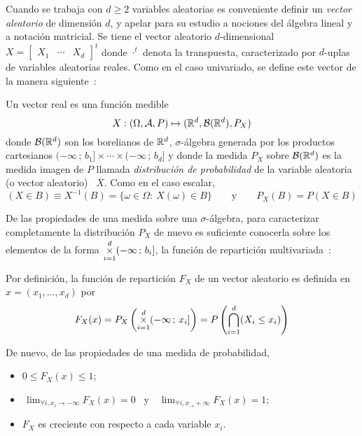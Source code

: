 Cuando se trabaja  con $d\geq 2$ variables aleatorias  es conveniente definir un
{\it vector aleatorio}  de dimensi\'on $d$, y apelar para  su estudio a nociones
del \'algebra  lineal y  a notaci\'on matricial.   Se tiene el  vector aleatorio
$d$-dimensional \ $X = \begin{bmatrix} X_1 & \cdots & X_d \end{bmatrix}^t$ donde
$\cdot^t$  denota  la  transpuesta,  caracterizado por  $d$-uplas  de  variables
aleatorias reales.   Como en  el caso  univariado, se define  este vector  de la
manera siguiente~\cite{AthLah06, Coh13, Bre88}:
%
\begin{definicion}
  Un vector real es una funci\'on medible
  \[
  X: (\Omega,\mathcal{A},P) \mapsto (\mathbb{R}^d,\mathcal{B}(\mathbb{R}^d),P_X)
  \]
  donde  $\mathcal{B}(\mathbb{R}^d)$  son  los  borelianos  de  $\mathbb{R}^d$,  $\sigma$-\'algebra
  generada por  los productos cartesianos $(-\infty  \, ; \,  b_1] \times \cdots
  \times (-\infty \,  ; \, b_d]$ y donde la medida  $P_X$ sobre $\mathcal{B}(\mathbb{R}^d)$ es
  la medida  imagen de  $P$ llamada {\it  distribuci\'on de probabilidad}  de la
  variable aleatoria (o vector aleatorio) \ $X$. Como en el caso escalar,
 \[
 (X \in B) \equiv X^{-1}(B) = \{ \omega \in \Omega: \: X(\omega) \in B \} \qquad
 \mbox{y} \qquad P_X(B) = P(X \in B)
 \]
\end{definicion}
%
De las propiedades de una medida sobre una $\sigma$-\'algebra, para caracterizar
completamente la distribuci\'on $P_X$ de nuevo es suficiente conocerla sobre los
elementos de  la forma $\displaystyle  \operatorname*{\times}_{i=1}^d (-\infty \, ;  \, b_i]$,
\ie  la funci\'on  de repartici\'on  multivariada~\cite{AthLah06,  Coh13, Bre88,
  HogMck13}:
%
\begin{definicion}
  Por  definici\'on,  la  funci\'on  de  repartici\'on  $F_X$  de  un vector
  aleatorio es definida en $x = (x_1 , \ldots , x_d)$ por
  \[
  F_X(x) =  P_X\left( \operatorname*{\times}_{i=1}^d (-\infty \,  ; \, x_i]  \right) = P\left(
    \bigcap_{i=1}^d (X_i \le x_i) \right)
  \]
\end{definicion}
%
De nuevo, de las propiedades de una medida de probabilidad,
%
\begin{itemize}
\item $0 \le F_X(x) \le 1$;
%
\item $\displaystyle  \, \lim_{\forall  i, x_i \to  -\infty} F_X(x)  = 0$ \  y \
  $\displaystyle \, \lim_{\forall i, x_ \to +\infty} F_X(x) = 1$;
%
\item $F_X$ es creciente con respecto a cada variable $x_i$.
\end{itemize}
